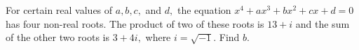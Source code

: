 For certain real values of $a, b, c,$ and $d,$ the equation $x^4+ax^3+bx^2+cx+d=0$ has four non-real roots.  The product of two of these roots is $13+i$ and the sum of the other two roots is $3+4i,$ where $i=\sqrt{-1}.$  Find $b.$